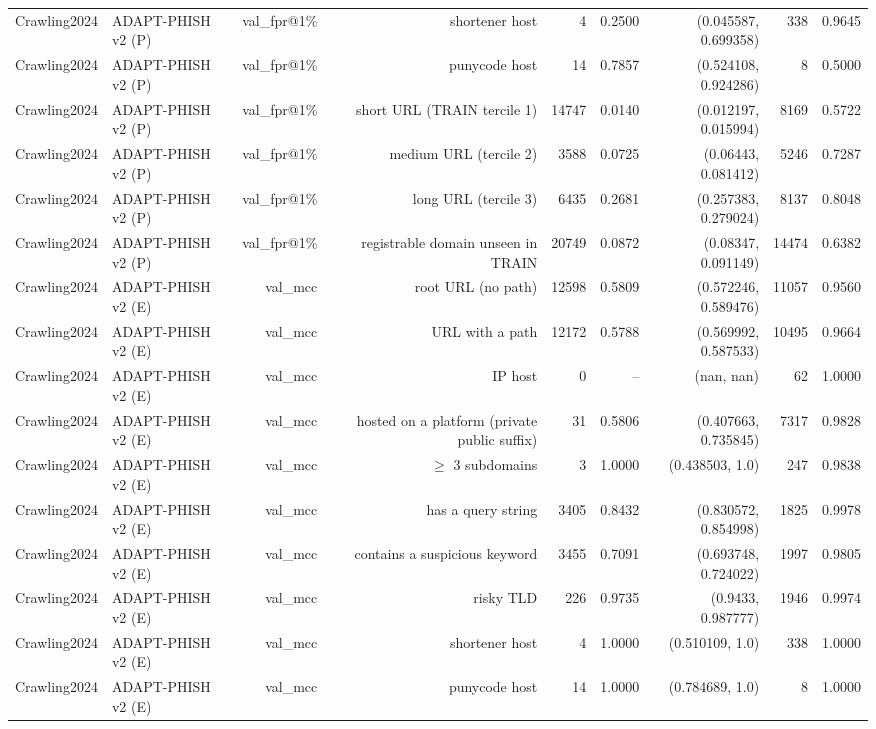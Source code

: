 \begin{table}[t]
\begin{tabular}{llrrrrrrr}
Crawling2024 & ADAPT-PHISH v2 (P) & val\_fpr@1\% & shortener host & 4 & 0.2500 & (0.045587, 0.699358) & 338 & 0.9645 \\
Crawling2024 & ADAPT-PHISH v2 (P) & val\_fpr@1\% & punycode host & 14 & 0.7857 & (0.524108, 0.924286) & 8 & 0.5000 \\
Crawling2024 & ADAPT-PHISH v2 (P) & val\_fpr@1\% & short URL (TRAIN tercile 1) & 14747 & 0.0140 & (0.012197, 0.015994) & 8169 & 0.5722 \\
Crawling2024 & ADAPT-PHISH v2 (P) & val\_fpr@1\% & medium URL (tercile 2) & 3588 & 0.0725 & (0.06443, 0.081412) & 5246 & 0.7287 \\
Crawling2024 & ADAPT-PHISH v2 (P) & val\_fpr@1\% & long URL (tercile 3) & 6435 & 0.2681 & (0.257383, 0.279024) & 8137 & 0.8048 \\
Crawling2024 & ADAPT-PHISH v2 (P) & val\_fpr@1\% & registrable domain unseen in TRAIN & 20749 & 0.0872 & (0.08347, 0.091149) & 14474 & 0.6382 \\
Crawling2024 & ADAPT-PHISH v2 (E) & val\_mcc & root URL (no path) & 12598 & 0.5809 & (0.572246, 0.589476) & 11057 & 0.9560 \\
Crawling2024 & ADAPT-PHISH v2 (E) & val\_mcc & URL with a path & 12172 & 0.5788 & (0.569992, 0.587533) & 10495 & 0.9664 \\
Crawling2024 & ADAPT-PHISH v2 (E) & val\_mcc & IP host & 0 & -- & (nan, nan) & 62 & 1.0000 \\
Crawling2024 & ADAPT-PHISH v2 (E) & val\_mcc & hosted on a platform (private public suffix) & 31 & 0.5806 & (0.407663, 0.735845) & 7317 & 0.9828 \\
Crawling2024 & ADAPT-PHISH v2 (E) & val\_mcc & $\geq$ 3 subdomains & 3 & 1.0000 & (0.438503, 1.0) & 247 & 0.9838 \\
Crawling2024 & ADAPT-PHISH v2 (E) & val\_mcc & has a query string & 3405 & 0.8432 & (0.830572, 0.854998) & 1825 & 0.9978 \\
Crawling2024 & ADAPT-PHISH v2 (E) & val\_mcc & contains a suspicious keyword & 3455 & 0.7091 & (0.693748, 0.724022) & 1997 & 0.9805 \\
Crawling2024 & ADAPT-PHISH v2 (E) & val\_mcc & risky TLD & 226 & 0.9735 & (0.9433, 0.987777) & 1946 & 0.9974 \\
Crawling2024 & ADAPT-PHISH v2 (E) & val\_mcc & shortener host & 4 & 1.0000 & (0.510109, 1.0) & 338 & 1.0000 \\
Crawling2024 & ADAPT-PHISH v2 (E) & val\_mcc & punycode host & 14 & 1.0000 & (0.784689, 1.0) & 8 & 1.0000 \\

\end{tabular}
\end{table}
